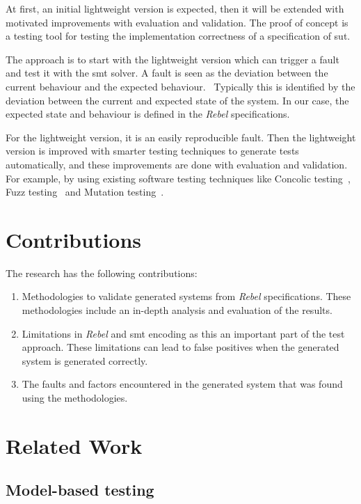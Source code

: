At first, an initial lightweight version is expected, then it will be extended with motivated
improvements with evaluation and validation. The proof of concept is a testing
tool for testing the implementation correctness of a specification of \gls{sut}.

The
approach is to start with the lightweight version which can trigger a fault and
test it with the \gls{smt} solver. A fault is seen as the deviation between the
current behaviour and the expected behaviour.~\cite{delgado2004taxonomy, leucker2009brief}
Typically this is identified by the deviation between the current and expected
state of the system. In our case, the expected state and behaviour is defined in
the \textit{Rebel} specifications.

For the lightweight version, it is an easily
reproducible fault. Then the lightweight version is improved with smarter
testing techniques to generate tests automatically, and these improvements are done
with evaluation and validation. For example, by using existing software testing
techniques like Concolic testing~\cite{sen2007concolic},
Fuzz testing~\cite{godefroid2008automated} and Mutation testing~\cite{jia2011analysis}.

\section{Contributions}
The research has the following contributions:

\begin{enumerate}
  \item Methodologies to validate generated systems from \textit{Rebel}
  specifications. These methodologies include an in-depth analysis and
  evaluation of the results.

  \item Limitations in \textit{Rebel} and \gls{smt} encoding as this an
  important part of the test approach. These limitations can lead to false
  positives when the generated system is generated correctly.

  \item The faults and factors encountered in the generated system that was found
  using the methodologies.
\end{enumerate}

\section{Related Work}

\subsection*{Model-based testing}

